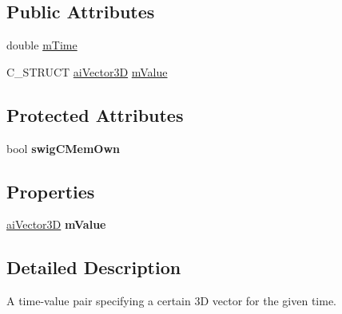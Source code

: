 \subsection*{Public Attributes}
\begin{DoxyCompactItemize}
\item 
double \hyperlink{structai_vector_key_ab3c43c166434c7a505083d1929f675bc}{m\+Time}
\item 
C\+\_\+\+S\+T\+R\+U\+C\+T \hyperlink{structai_vector3_d}{ai\+Vector3\+D} \hyperlink{structai_vector_key_a6f73649028b136a193dac21de35188ad}{m\+Value}
\end{DoxyCompactItemize}
\subsection*{Protected Attributes}
\begin{DoxyCompactItemize}
\item 
\hypertarget{structai_vector_key_afcba693d8a4b8effa70ce43b52b04970}{bool {\bfseries swig\+C\+Mem\+Own}}\label{structai_vector_key_afcba693d8a4b8effa70ce43b52b04970}

\end{DoxyCompactItemize}
\subsection*{Properties}
\begin{DoxyCompactItemize}
\item 
\hypertarget{structai_vector_key_adcafa9ac0b1e77867a08527c05dc9586}{\hyperlink{structai_vector3_d}{ai\+Vector3\+D} {\bfseries m\+Value}}\label{structai_vector_key_adcafa9ac0b1e77867a08527c05dc9586}

\end{DoxyCompactItemize}


\subsection{Detailed Description}
A time-\/value pair specifying a certain 3\+D vector for the given time. 

